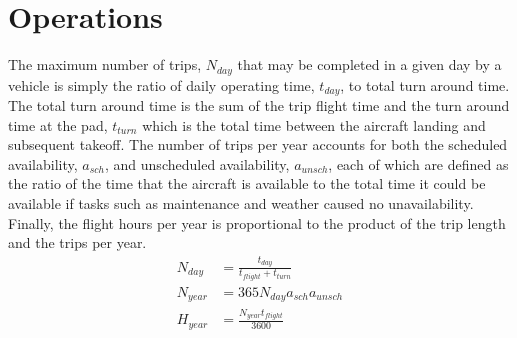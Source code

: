 \documentclass[12pt, letter]{article}
\begin{document}
\section{Operations}
The maximum number of trips, $N_{day}$ that may be completed in a given day by a vehicle is simply the ratio of daily operating time, $t_{day}$, to total turn around time. The total turn around time is the sum of the trip flight time and the turn around time at the pad, $t_{turn}$ which is the total time between the aircraft landing and subsequent takeoff. The number of trips per year accounts for both the scheduled availability, $a_{sch}$, and unscheduled availability, $a_{unsch}$, each of which are defined as the ratio of the time that the aircraft is available to the total time it could be available if tasks such as maintenance and weather caused no unavailability. Finally, the flight hours per year is proportional to the product of the trip length and the trips per year.
\begin{align}
	N_{day}&=\frac{t_{day}}{t_{flight}+t_{turn}} \\
	N_{year}&=365 N_{day} a_{sch} a_{unsch} \\
	H_{year}&=\frac{N_{year} t_{flight}}{3600}
\end{align}
\end{document}
